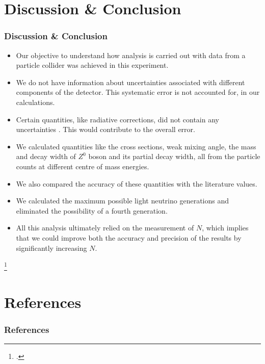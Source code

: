 \documentclass[10pt]{beamer}
\begin{document}
\section{Discussion \& Conclusion}
\begin{frame}
\frametitle{Discussion \& Conclusion}
\begin{itemize}
  \item Our objective to understand how analysis is carried out with data from a particle collider was achieved in this experiment.
  \item We do not have information about uncertainties associated with different components of the detector. This systematic error is not accounted for, in our calculations.
  \item Certain quantities, like radiative corrections, did not contain any uncertainties \footnotemark{}. This would contribute to the overall error.
  \item We calculated quantities like the cross sections, weak mixing angle, the mass and decay width of $Z^0$ boson and its partial decay width, all from the particle counts at different centre of mass energies.
  \item We also compared the accuracy of these quantities with the literature values.
  \item We calculated the maximum possible light neutrino generations and eliminated the possibility of a fourth generation.
  \item All this analysis ultimately relied on the measurement of $N$, which implies that we could improve both the accuracy and precision of the results by significantly increasing $N$.
\end{itemize}
\footcitetext{UB} 
\end{frame}

\section*{References}
\begin{frame}
\frametitle{References}
\printbibliography
\end{frame}
\end{document}
